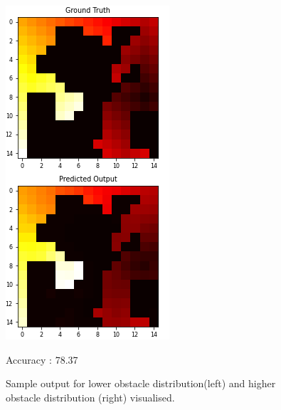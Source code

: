 \begin{figure}[!htb]
\begin{minipage}{0.5\textwidth}
     \includegraphics[width=.7\linewidth]{../openreview/images/media_images_test_samples_5480_0(1)(1)(1).png}
    \caption{Accuracy : 78.37}
   \end{minipage}
   \caption{Sample output for lower obstacle distribution(left) and higher obstacle distribution (right) visualised.}
\end{figure}

